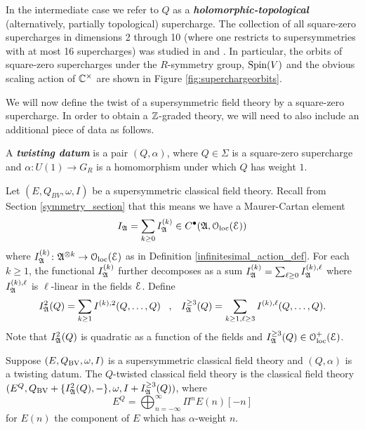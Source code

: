 \documentclass[10pt, oneside]{article}
\newcommand{\defterm}[1]{\textbf{\emph{#1}}}
\begin{document}
In the intermediate case we refer to $Q$ as a \defterm{holomorphic-topological} (alternatively, partially topological) supercharge. The collection of all square-zero supercharges in dimensions 2 through 10 (where one restricts to supersymmetries with at most 16 supercharges) was studied in \cite{ElliottSafronov} and \cite{EagerSaberiWalcher}. In particular, the orbits of square-zero supercharges under the $R$-symmetry group, $\mathrm{Spin}(V)$ and the obvious scaling action of $\mathbb C^\times$ are shown in Figure \ref{fig:superchargeorbits}.

We will now define the twist of a supersymmetric field theory by a square-zero supercharge.  In order to obtain a $\mathbb Z$-graded theory, we will need to also include an additional piece of data as follows.

\begin{definition}
A \defterm{twisting datum} is a pair $(Q, \alpha)$, where $Q\in\Sigma$ is a square-zero supercharge and $\alpha\colon U(1)\rightarrow G_R$ is a homomorphism under which $Q$ has weight $1$.
\end{definition}

Let $(E, Q_{BV}, \omega, I)$ be a supersymmetric classical field theory.
Recall from Section \ref{symmetry_section} that this means we have a Maurer-Cartan element 
\[
I_{\mathfrak A} = \sum_{k \geq 0} I_{\mathfrak A}^{(k)} \in C^\bullet(\mathfrak A, \mathcal{O}_{\rm loc}(\mathcal E))
\]
where $I_{\mathfrak A}^{(k)} \colon \mathfrak A^{\otimes k} \to \mathcal{O}_{\rm loc}(\mathcal E)$ as in Definition \ref{infinitesimal_action_def}. 
For each $k \geq 1$, the functional $I_{\mathfrak A}^{(k)}$ further decomposes as a sum $I_{\mathfrak A}^{(k)} = \sum_{\ell \geq 0} I_\mathfrak A^{(k),\ell}$ where $I_\mathfrak A^{(k),\ell}$ is $\ell$-linear in the fields $\mathcal E$. 
Define
\[
I_{\mathfrak A}^2 (Q) = \sum_{k \geq 1} I^{(k),2} (Q, \ldots, Q) \;\;\; , \;\;\; I_{\mathfrak A}^{\geq 3} (Q) =  \sum_{k \geq 1, \ell \geq 3} I^{(k),\ell} (Q, \ldots, Q) .
\]
Note that $I_{\mathfrak A}^2 (Q)$ is quadratic as a function of the fields and $I_{\mathfrak A}^{\geq 3}(Q) \in \mathcal O_{\rm loc}^+(\mathcal E)$. 

\begin{definition} \label{def:twisting}
Suppose $(E, Q_{\mathrm{BV}}, \omega, I)$ is a supersymmetric classical field theory and $(Q, \alpha)$ is a twisting datum. The {$Q$-twisted classical field theory} is the classical field theory $(E^Q, Q_{\mathrm{BV}} + \{I_{\mathfrak A}^2(Q), -\}, \omega, I + I_{\mathfrak A}^{\ge 3}(Q))$, where
\[E^Q = \bigoplus_{n=-\infty}^\infty \Pi^n E(n)[-n]\]
for $E(n)$ the component of $E$ which has $\alpha$-weight $n$.
\end{definition}
\end{document}
